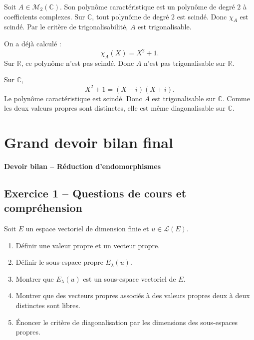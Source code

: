 \documentclass[11pt,a4paper]{article}
\newcommand{\R}{\mathbb R}
\newcommand{\C}{\mathbb C}
\newcommand{\M}{\mathcal M}
\newcommand{\Lcal}{\mathcal L}
\begin{document}
\begin{correctionbox}[9]
Soit \(A\in\M_2(\C)\).  
Son polynôme caractéristique est un polynôme de degré \(2\) à coefficients complexes.  
Sur \(\C\), tout polynôme de degré \(2\) est scindé.  
Donc \(\chi_A\) est scindé.  
Par le critère de trigonalisabilité, \(A\) est trigonalisable.
\end{correctionbox}

\begin{correctionbox}[10]
On a déjà calculé :
\[
\chi_A(X)=X^2+1.
\]
Sur \(\R\), ce polynôme n'est pas scindé.  
Donc \(A\) n'est pas trigonalisable sur \(\R\).

Sur \(\C\),
\[
X^2+1=(X-i)(X+i).
\]
Le polynôme caractéristique est scindé.  
Donc \(A\) est trigonalisable sur \(\C\).  
Comme les deux valeurs propres sont distinctes, elle est même diagonalisable sur \(\C\).
\end{correctionbox}

\newpage
\section{Grand devoir bilan final}

\begin{center}
\Large\textbf{Devoir bilan -- Réduction d'endomorphismes}
\end{center}

\subsection*{Exercice 1 -- Questions de cours et compréhension}

Soit \(E\) un espace vectoriel de dimension finie et \(u\in\Lcal(E)\).

\begin{enumerate}
    \item Définir une valeur propre et un vecteur propre.
    \item Définir le sous-espace propre \(E_\lambda(u)\).
    \item Montrer que \(E_\lambda(u)\) est un sous-espace vectoriel de \(E\).
    \item Montrer que des vecteurs propres associés à des valeurs propres deux à deux distinctes sont libres.
    \item Énoncer le critère de diagonalisation par les dimensions des sous-espaces propres.
\end{enumerate}
\end{document}
